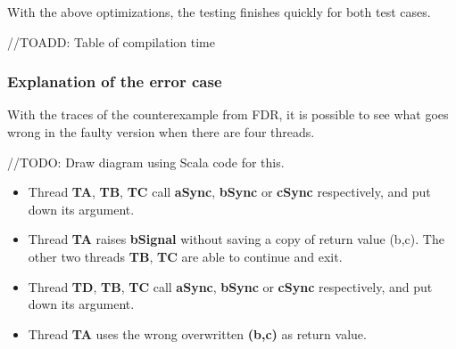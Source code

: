 \documentclass{article}
\begin{document}
With the above optimizations, the testing finishes quickly for both test cases.

//TOADD: Table of compilation time

\subsubsection{Explanation of the error case}
With the traces of the counterexample from FDR, it is possible to see what goes wrong in the faulty version when there are four threads.

//TODO: Draw diagram using Scala code for this.
\begin{itemize}
    \item Thread \textbf{TA}, \textbf{TB}, \textbf{TC} call \textbf{aSync}, \textbf{bSync} or \textbf{cSync} respectively, and put down its argument.
    \item Thread \textbf{TA} raises \textbf{bSignal} without saving a copy of return value {(b,c)}. The other two threads \textbf{TB}, \textbf{TC} are able to continue and exit. 
    \item Thread \textbf{TD}, \textbf{TB}, \textbf{TC} call \textbf{aSync}, \textbf{bSync} or \textbf{cSync} respectively, and put down its argument.
    \item Thread \textbf{TA} uses the wrong overwritten \textbf{(b,c)} as return value. 
\end{itemize}
\end{document}
